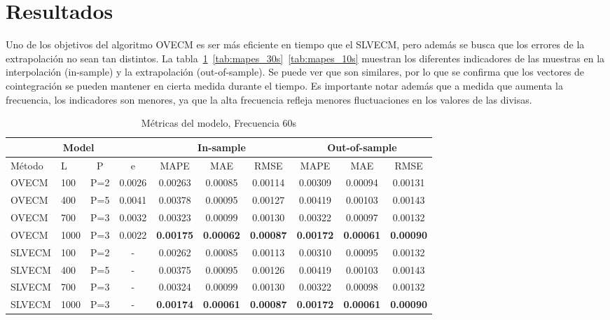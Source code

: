 \section{Resultados}
Uno de los objetivos del algoritmo OVECM es ser más eficiente en tiempo que el
SLVECM, pero además se busca que los errores de la extrapolación no sean tan
distintos. La tabla~\ref{tab:mapes_60s}~\ref{tab:mapes_30s}~\ref{tab:mapes_10s}
muestran los diferentes indicadores de las muestras en la interpolación
(in-sample) y la extrapolación (out-of-sample). Se puede ver que son similares,
por lo que se confirma que los vectores de cointegración se pueden mantener en
cierta medida durante el tiempo. Es importante notar además que a medida que
aumenta la frecuencia, los indicadores son menores, ya que la alta frecuencia
refleja menores fluctuaciones en los valores de las divisas.

\begin{table}[ht!]
\caption{Métricas del modelo, Frecuencia 60s}
\label{tab:mapes_60s}
\begin{center}
\begin{adjustbox}{max width=\textwidth}
\begin{tabular}{|l|l|c|c|c|c|c|c|c|c|}
\hline
\multicolumn{4}{|c|}{Model} & \multicolumn{3}{|c|}{In-sample} &
\multicolumn{3}{|c|}{Out-of-sample} \\ 
\hline
\hline
Método & L & P & e &
MAPE & MAE& RMSE&
MAPE & MAE& RMSE \\
\hline
 OVECM  &   100  &  P=2& 0.0026  &  0.00263&  0.00085&  0.00114&  0.00309&  0.00094&  0.00131\\
 OVECM  &   400  &  P=5& 0.0041  &  0.00378&  0.00095&  0.00127&  0.00419&  0.00103&  0.00143\\
 OVECM  &   700  &  P=3& 0.0032  &  0.00323&  0.00099&  0.00130&  0.00322&  0.00097&  0.00132\\
 OVECM  &   1000 &  P=3& 0.0022  &
 \textbf{0.00175}&  \textbf{0.00062}&  \textbf{0.00087} &
 \textbf{0.00172}&  \textbf{0.00061}&  \textbf{0.00090}\\
\hline
 SLVECM  &   100 &  P=2& -  &  0.00262&  0.00085&  0.00113&  0.00310&  0.00095&  0.00132\\
 SLVECM  &   400 &  P=5& -  &  0.00375&  0.00095&  0.00126&  0.00419&  0.00103&  0.00143\\
 SLVECM  &   700 &  P=3& -  &  0.00324&  0.00099&  0.00130&  0.00322&  0.00098&  0.00132\\
 SLVECM  &   1000 &  P=3& -  &
 \textbf{0.00174}&  \textbf{0.00061}&  \textbf{0.00087}&
 \textbf{0.00172}&  \textbf{0.00061}&  \textbf{0.00090}\\
\hline
\end{tabular}
\end{adjustbox}
\end{center}
\end{table}


